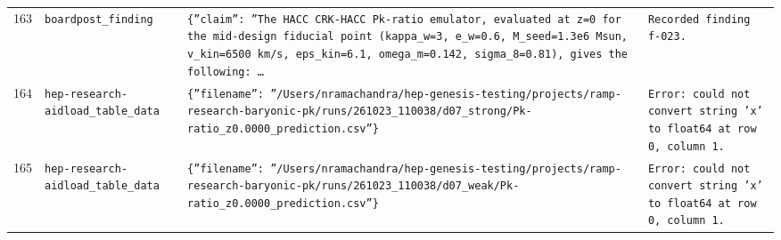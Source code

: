\documentclass[11pt,a4paper]{article}
\begin{document}
\begin{longtable}{@{}p{}p{}p{}p{}@{}}
163 & \texttt{board}\newline\texttt{post\_\allowbreak{}finding} & \texttt{\{''claim'':\allowbreak{} ''The HACC CRK-HACC Pk-ratio emulator,\allowbreak{} evaluated at z=\allowbreak{}0 for the mid-design fiducial point (kappa\_\allowbreak{}w=\allowbreak{}3,\allowbreak{} e\_\allowbreak{}w=\allowbreak{}0.6,\allowbreak{} M\_\allowbreak{}seed=\allowbreak{}1.3e6 Msun,\allowbreak{} v\_\allowbreak{}kin=\allowbreak{}6500 km/\allowbreak{}s,\allowbreak{} eps\_\allowbreak{}kin=\allowbreak{}6.1,\allowbreak{} omega\_\allowbreak{}m=\allowbreak{}0.142,\allowbreak{} sigma\_\allowbreak{}8=\allowbreak{}0.81)\allowbreak{},\allowbreak{} gives the following:\allowbreak{} \ldots{}\allowbreak{}} & \texttt{Recorded finding f-023.} \\
164 & \texttt{hep-research-aid}\newline\texttt{load\_\allowbreak{}table\_\allowbreak{}data} & \texttt{\{''filename'':\allowbreak{} ''/\allowbreak{}Users/\allowbreak{}nramachandra/\allowbreak{}hep-genesis-testing/\allowbreak{}projects/\allowbreak{}ramp-research-baryonic-pk/\allowbreak{}runs/\allowbreak{}261023\_\allowbreak{}110038/\allowbreak{}d07\_\allowbreak{}strong/\allowbreak{}Pk-ratio\_\allowbreak{}z0.0000\_\allowbreak{}prediction.csv''\}\allowbreak{}} & \texttt{Error:\allowbreak{} could not convert string 'x' to float64 at row 0,\allowbreak{} column 1.} \\
165 & \texttt{hep-research-aid}\newline\texttt{load\_\allowbreak{}table\_\allowbreak{}data} & \texttt{\{''filename'':\allowbreak{} ''/\allowbreak{}Users/\allowbreak{}nramachandra/\allowbreak{}hep-genesis-testing/\allowbreak{}projects/\allowbreak{}ramp-research-baryonic-pk/\allowbreak{}runs/\allowbreak{}261023\_\allowbreak{}110038/\allowbreak{}d07\_\allowbreak{}weak/\allowbreak{}Pk-ratio\_\allowbreak{}z0.0000\_\allowbreak{}prediction.csv''\}\allowbreak{}} & \texttt{Error:\allowbreak{} could not convert string 'x' to float64 at row 0,\allowbreak{} column 1.} \\

\end{longtable}
\end{document}

